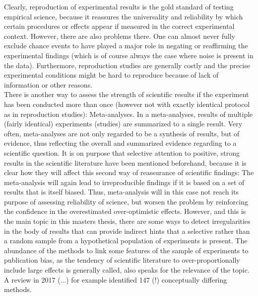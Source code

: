 \documentclass[11pt,a4paper,twoside]{book}\usepackage[]{graphicx}\usepackage[]{color}
\begin{document}
Clearly, reproduction of experimental results is the gold standard of testing empirical science, because it reassures the universality and reliability by which certain procedures or effects appear if measured in the correct experimental context. However, there are also problems there. One can almost never fully exclude chance events to have played a major role in negating or reaffirming the experimental findings (which is of course always the case where noise is present in the data). Furthermore, reproduction studies are generally costly and the precise experimental conditions might be hard to reproduce because of lack of information or other reasons. \\
There is another way to assess the strength of scientific results if the experiment has been conducted more than once (however not with exactly identical protocol as in reproduction studies): Meta-analyses. In a meta-analyses, results of multiple (fairly identical) experiments (studies) are summarized to a single result. Very often, meta-analyses are not only regarded to be a synthesis of results, but of evidence, thus reflecting the overall and summarized evidence regarding to a scientific question. It is on purpose that selective attention to positive, strong results in the scientific literature have been mentioned beforehand, because it is clear how they will affect this second way of reassurance of scientific findings: The meta-analysis will again lead to irreproducible findings if it is based on a set of results that is itself biased. Thus, meta-analysis will in this case not reach its purpose of assessing reliability of science, but worsen the problem by reinforcing the confidence in the overestimated over-optimistic effects. However, and this is the main topic in this masters thesis, there are some ways to detect irregularities in the body of results that can provide indirect hints that a selective rather than a random sample from a hypothetical population of experiments is present. The abundance of the methods to link some features of the sample of experiments to publication bias, as the tendency of scientific literature to over-proportionally include large effects is generally called, also speaks for the relevance of the topic. A review in 2017 (...) for example identified 147 (!) conceptually differing methods.\\
\end{document}
